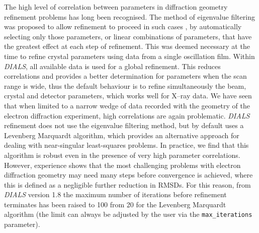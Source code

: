 \documentclass[preprint]{iucr}
\newcommand{\dials}{\emph{DIALS}\xspace}
\newcommand{\code}{\texttt}
\newcounter{DWCounter}
\newcommand{\DW}[1]{%
   \stepcounter{DWCounter}%
   {\color{red}{\textbf{DW \#\arabic{DWCounter}: }#1}}%
  }
\begin{document}

The high level of correlation between parameters in diffraction geometry
refinement problems has long been recognised. The method of eigenvalue
filtering was proposed to allow refinement to proceed in such cases
\cite{Reeke1984,LURE1986phase3}, by automatically selecting only those
parameters, or linear combinations of parameters, that have the greatest effect
at each step of refinement. This was deemed necessary at the time to refine
crystal parameters using data from a single oscillation film. Within \dials,
all available data is used for a global refinement. This reduces correlations
and provides a better determination for parameters when the scan range is wide,
thus the default behaviour is to refine simultaneously the beam, crystal and
detector parameters, which works well for X--ray data. We have seen that when
limited to a narrow wedge of data recorded with the geometry of the electron
diffraction experiment, high correlations are again problematic. \dials
refinement does not use the eigenvalue filtering method, but by default uses a
Levenberg Marquardt algorithm, which provides an alternative approach for
dealing with near-singular least-squares problems. In practice, we find that
this algorithm is robust even in the presence of very high parameter
correlations. However, experience shows that the most challenging problems with
electron diffraction geometry may need many steps before convergence is
achieved, where this is defined as a negligible further reduction in RMSDs. For
this reason, from \dials version 1.8 the maximum number of iterations before
refinement terminates has been raised to 100 from 20 for the Levenberg
Marquardt algorithm (the limit can always be adjusted by the user via the
\code{max\_iterations} parameter).
\end{document}
